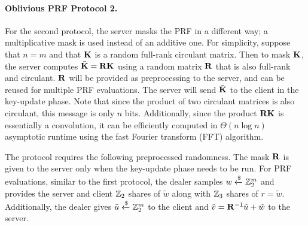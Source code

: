 \paragraph{Oblivious PRF Protocol 2.}
For the second protocol, the server masks the PRF in a different way; a multiplicative mask is used instead of an additive one. For simplicity, suppose that $n=m$ and that $\mat{K}$ is a random full-rank circulant matrix. Then to mask $\mat{K}$, the server computes $\bar{\mat{K}} = \mat{R}\mat{K}$ using a random matrix $\mat{R}$ that is also full-rank and circulant. $\mat{R}$ will be provided as preprocessing to the server, and can be reused for multiple PRF evaluations. The server will send $\bar{\mat{K}}$ to the client in the key-update phase. Note that since the product of two circulant matrices is also circulant, this message is only $n$ bits. Additionally, since the product $\mat{R}\mat{K}$ is essentially a convolution, it can be efficiently computed in $\Theta(n\log n)$ asymptotic runtime using the fast Fourier transform (FFT) algorithm.

The protocol requires the following preprocessed randomness. The mask $\mat{R}$ is given to the server only when the key-update phase needs to be run. For PRF evaluations, similar to the first protocol, the dealer samples $w \xleftarrow{\$} \mathbb{Z}_2^m$ and provides the server and client $\mathbb{Z}_2$ shares of $\tilde{w}$ along with $\mathbb{Z}_3$ shares of $r = \tilde{w}$. Additionally, the dealer gives $\tilde{u} \xleftarrow{\$} \mathbb{Z}_2^m$ to the client and $\tilde{v} = \mat{R}^{-1}\tilde{u} + \tilde{w}$ to the server.

